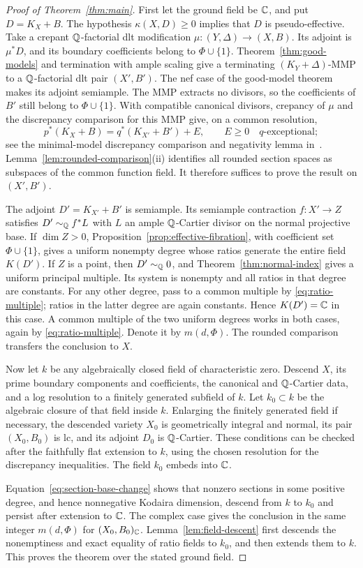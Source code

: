 \begin{proof}[Proof of Theorem~\ref{thm:main}]
First let the ground field be $\mathbb C$, and put $D=K_X+B$.
The hypothesis $\kappa(X,D)\geq0$ implies that $D$ is
pseudo-effective.  Take a crepant $\mathbb Q$-factorial dlt modification
$\mu:(Y,\Delta)\to(X,B)$.  Its adjoint is $\mu^*D$, and its
boundary coefficients belong to $\Phi\cup\{1\}$.
Theorem~\ref{thm:good-models} and termination with ample scaling
\cite[Theorem~A]{TX} give a terminating $(K_Y+\Delta)$-MMP to a
$\mathbb Q$-factorial dlt pair $(X',B')$.  The nef case of the good-model
theorem makes its adjoint semiample.  The MMP extracts no divisors,
so the coefficients of $B'$ still belong to $\Phi\cup\{1\}$.
With compatible canonical divisors, crepancy of $\mu$ and the
discrepancy comparison for this MMP give, on a common resolution,
\[
 p^*(K_X+B)=q^*(K_{X'}+B')+E,
 \qquad E\geq0\quad\text{$q$-exceptional};
\]
see the minimal-model discrepancy comparison and negativity lemma
in~\cite{KM}.  Lemma~\ref{lem:rounded-comparison}(ii) identifies all
rounded section spaces as subspaces of the common function field.
It therefore suffices to prove the result on $(X',B')$.

The adjoint $D'=K_{X'}+B'$ is semiample.  Its semiample contraction
$f:X'\to Z$ satisfies $D'\sim_{\mathbb Q} f^*L$ with $L$ an ample
$\mathbb Q$-Cartier divisor on the normal projective base.  If $\dim Z>0$,
Proposition~\ref{prop:effective-fibration}, with coefficient set
$\Phi\cup\{1\}$, gives a uniform nonempty degree whose ratios
generate the entire field $K(D')$.
If $Z$ is a point, then $D'\sim_{\mathbb Q}0$, and
Theorem~\ref{thm:normal-index} gives a uniform principal multiple.
Its system is nonempty and all ratios in that degree are constants.
For any other degree, pass to a common multiple by
\eqref{eq:ratio-multiple}; ratios in the latter degree are again
constants.  Hence $K(D')=\mathbb C$ in this case.  A common multiple of the
two uniform degrees works in both cases, again by
\eqref{eq:ratio-multiple}.  Denote it by $m(d,\Phi)$.  The rounded
comparison transfers the conclusion to $X$.

Now let $k$ be any algebraically closed field of characteristic zero.
Descend $X$, its prime boundary components and coefficients, the
canonical and $\mathbb Q$-Cartier data, and a log resolution to a finitely
generated subfield of $k$.  Let $k_0\subset k$ be the algebraic
closure of that field inside $k$.  Enlarging the finitely generated
field if necessary, the descended variety $X_0$ is geometrically
integral and normal, its pair $(X_0,B_0)$ is lc, and its adjoint
$D_0$ is $\mathbb Q$-Cartier.  These conditions can be checked after the
faithfully flat extension to $k$, using the chosen resolution for
the discrepancy inequalities.  The field $k_0$ embeds into $\mathbb C$.

Equation~\eqref{eq:section-base-change} shows that nonzero sections in
some positive degree, and hence nonnegative Kodaira dimension, descend
from $k$ to $k_0$ and persist after extension to $\mathbb C$.
The complex case gives the conclusion in the same integer
$m(d,\Phi)$ for $(X_0,B_0)_\mathbb C$.
Lemma~\ref{lem:field-descent} first descends the nonemptiness and exact
equality of ratio fields to $k_0$, and then extends them to $k$.
This proves the theorem over the stated ground field.
\end{proof}
